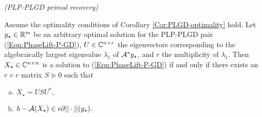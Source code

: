 \begin{cor} 		\label{Cor:PLGD-primal_recovery_refinement}
\emph{(PLP-PLGD primal recovery)}

Assume the optimality conditions of Corollary \ref{Cor:PLGD-optimality} hold. Let $y_\star \in {\mathbb R}^m$ be an arbitrary optimal solution for the PLP-PLGD pair (\ref{Eqn:PhaseLift-P-GD}),  $U \in {\mathbb C}^{n \times r}$ the eigenvectors corresponding to the algebraically largest eigenvalue $\lambda_1$ of ${\mathcal A}^*y_\star$, and $r$ the multiplicity of $\lambda_1$.  
Then $X_\star \in {\mathbb C}^{n \times n}$ is a solution to (\ref{Eqn:PhaseLift-P-GD}) if and only if there exists an $r \times r$ matrix $S \succeq 0$ such that
\begin{enumerate}[(a)]
\item
$X_\star = USU^*,$
\item
$b - {\mathcal A}(X_\star) \in \epsilon \partial ||\cdot||(y_\star).$
\end{enumerate}
\end{cor}
